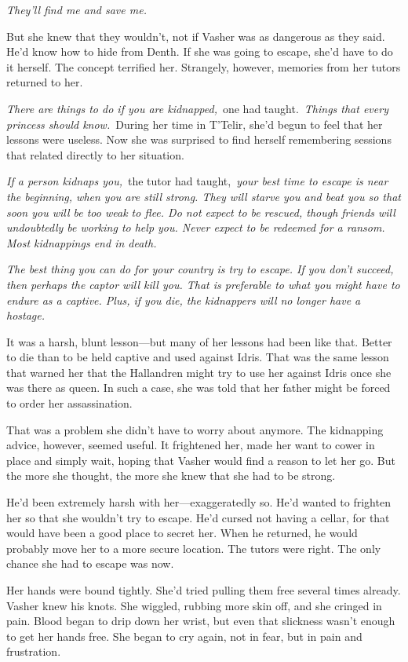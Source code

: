 \textit{They’ll find me and save me.}

But she knew that they wouldn’t, not if Vasher was as dangerous as they said. He’d know how to hide from Denth. If she was going to escape, she’d have to do it herself. The concept terrified her. Strangely, however, memories from her tutors returned to her.

\textit{There are things to do if you are kidnapped,}~one had taught.~\textit{Things that every princess should know.}~During her time in T’Telir, she’d begun to feel that her lessons were useless. Now she was surprised to find herself remembering sessions that related directly to her situation.

\textit{If a person kidnaps you,}~the tutor had taught,~\textit{your best time to escape is near the beginning, when you are still strong. They will starve you and beat you so that soon you will be too weak to flee. Do not expect to be rescued, though friends will undoubtedly be working to help you. Never expect to be redeemed for a ransom. Most kidnappings end in death.}

\textit{The best thing you can do for your country is try to escape. If you don’t succeed, then perhaps the captor will kill you. That is preferable to what you might have to endure as a captive. Plus, if you die, the kidnappers will no longer have a hostage.}

It was a harsh, blunt lesson—but many of her lessons had been like that. Better to die than to be held captive and used against Idris. That was the same lesson that warned her that the Hallandren might try to use her against Idris once she was there as queen. In such a case, she was told that her father might be forced to order her assassination.

That was a problem she didn’t have to worry about anymore. The kidnapping advice, however, seemed useful. It frightened her, made her want to cower in place and simply wait, hoping that Vasher would find a reason to let her go. But the more she thought, the more she knew that she had to be strong.

He’d been extremely harsh with her—exaggeratedly so. He’d wanted to frighten her so that she wouldn’t try to escape. He’d cursed not having a cellar, for that would have been a good place to secret her. When he returned, he would probably move her to a more secure location. The tutors were right. The only chance she had to escape was now.

Her hands were bound tightly. She’d tried pulling them free several times already. Vasher knew his knots. She wiggled, rubbing more skin off, and she cringed in pain. Blood began to drip down her wrist, but even that slickness wasn’t enough to get her hands free. She began to cry again, not in fear, but in pain and frustration.

